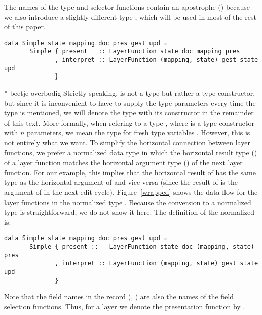 \documentclass[preprint,natbib]{sigplanconf}
\begin{document}
\bc The names of the type and selector functions contain an apostrophe () because we also introduce a slightly different type , which will be used in most of the rest of this paper.  \ec

\begin{small}
\begin{verbatim}
data Simple state mapping doc pres gest upd =
       Simple { present   :: LayerFunction state doc mapping pres
              , interpret :: LayerFunction (mapping, state) gest state upd
              }
\end{verbatim}
\end{small}


\bc ** beetje overbodig
Strictly speaking,  is not a type but rather a type constructor, but since it is inconvenient to have to supply the type parameters every time the type is mentioned, we will denote the type with its constructor in the remainder of this text. More formally, when refering to a type , where  is a type constructor with $n$ parameters, we mean the type  for fresh type variables .
\ec
However, this is not entirely what we want. To simplify the horizontal connection between layer functions, we prefer a normalized data type in which the horizontal result type () of a layer function matches the horizontal argument type () of the next layer function. For our example, this implies that the horizontal result of  has the same type as the horizontal argument of  and vice versa (since the result of  is the argument of  in the next edit cycle). Figure~\ref{wrapped} shows the data flow for the layer functions in the normalized type . Because the conversion to a normalized type is straightforward, we do not show it here. The definition of the normalized  is:

\begin{small}
\begin{verbatim}
data Simple state mapping doc pres gest upd =
       Simple { present ::   LayerFunction state doc (mapping, state) pres
              , interpret :: LayerFunction (mapping, state) gest state upd
              }
\end{verbatim}
\end{small}


Note that the field names in the record (, ) are also the names of the field selection functions. Thus, for a layer  we denote the presentation function by . 
\end{document}
